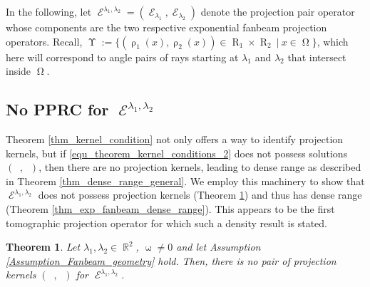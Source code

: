 \documentclass[12pt]{article}
\newtheorem{theorem}{Theorem}
\DeclareMathOperator{\Xgroundset}{\Upsilon}
\DeclareMathOperator{\RR}{{\mathbb{R}}}
\DeclareMathOperator{\ExpoFanbeam}{\mathcal{E}}
\DeclareMathOperator{\raygroundset}{R}
\DeclareMathOperator{\rayinverse}{\rho}
\DeclareMathOperator{\Vone}{V_1}
\DeclareMathOperator{\Vtwo}{V_2}
\DeclareMathOperator{\attenuation}{\omega}
\newcommand{\conditionname}{$\mathrm{PPRC}$}
\DeclareMathOperator{\imgdom}{{\Omega}}
\begin{document}
In the following, let  $\ExpoFanbeam^{\lambda_1,\lambda_2}=(\ExpoFanbeam_{\lambda_1},\ExpoFanbeam_{\lambda_2})$ denote the projection pair operator whose components are the two respective exponential fanbeam projection operators. 	Recall, $\Xgroundset:=\{ (\rayinverse_1(x),\rayinverse_2(x))\in \raygroundset_1\times \raygroundset_2 \ \big|\  x \in \imgdom\}$, which here will correspond to angle pairs of rays starting at $\lambda_1$ and $\lambda_2$ that intersect inside $\imgdom$.



\subsection{No PPRC for $\ExpoFanbeam^{\lambda_1,\lambda_2}$}
\label{Section_exponential_fanbeam_theory}
Theorem \ref{thm_kernel_condition} not only offers a way to identify projection kernels, but if \eqref{equ_theorem_kernel_conditions_2} does not possess solutions $(\Vone,\Vtwo)$, then there are no projection kernels, leading to dense range as described in Theorem \ref{thm_dense_range_general}. We employ this machinery to show that $\ExpoFanbeam^{\lambda_1,\lambda_2}$ does not possess projection kernels (Theorem \ref{thm_no_LPPRC_for_expo_fanbeam}) and thus has dense range (Theorem \ref{thm_exp_fanbeam_dense_range}). This appears to be the first tomographic projection operator for which such a density result is stated.


\begin{theorem} \label{thm_no_LPPRC_for_expo_fanbeam}
Let $\lambda_1,\lambda_2\in \RR^2$, $\attenuation \neq 0$ and let  Assumption \ref{Assumption_Fanbeam_geometry} hold. Then, there is no pair of projection kernels $(\Vone,\Vtwo)$ for $\ExpoFanbeam^{\lambda_1,\lambda_2}$.
\end{theorem}
\end{document}
